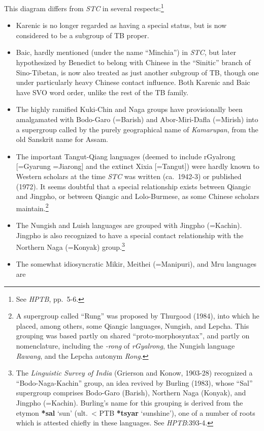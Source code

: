 \begin{itemize}
This diagram differs from \textit{STC} in several respects:\footnote{See \textit{HPTB}, pp.~5-6.}
\begin{itemize}
\item Karenic is no longer regarded as having a special status, but is now
considered to be a subgroup of TB proper.
\item Baic, hardly mentioned (under the name “Minchia”) in \textit{STC}, but later
hypothesized by Benedict to belong with Chinese in the “Sinitic” branch of 
Sino-Tibetan, is now also treated as just another subgroup of TB, though one
under particularly heavy Chinese contact influence. Both Karenic and Baic have
SVO word order, unlike the rest of the TB family.
\item The highly ramified Kuki-Chin and Naga groups have provisionally been
amalgamated with Bodo-Garo (=Barish) and Abor-Miri-Dafla (=Mirish) into a
supergroup called by the purely geographical name of \textit{Kamarupan}, from the old
Sanskrit name for Assam.
\item The important Tangut-Qiang languages (deemed to include rGyalrong
[=Gyarung =Jiarong] and the extinct Xixia [=Tangut]) were hardly known to Western
scholars at the time \textit{STC} was written (ca.~1942-3) or published (1972). It seems
doubtful that a special relationship exists between Qiangic and Jingpho, or
between Qiangic and Lolo-Burmese, as some Chinese scholars maintain.\footnote{A
supergroup called “Rung” was proposed by Thurgood (1984), into which he placed,
among others, some Qiangic languages, Nungish, and Lepcha.  This grouping was
based partly on shared “proto-morphosyntax”, and partly on nomenclature,
including the \textit{-rong} of \textit{rGyalrong},
the Nungish language \textit{Rawang}, and the Lepcha autonym \textit{Rong}.}
\item The Nungish and Luish languages are grouped with Jingpho (=Kachin).  Jingpho
is also recognized to have a special contact relationship with the Northern Naga
(=Konyak) group.\footnote{The \textit{Linguistic Survey of India}
(Grierson and Konow, 1903-28) recognized a “Bodo-Naga-Kachin” group,
an idea revived by Burling
(1983), whose “Sal” supergroup comprises Bodo-Garo (Barish), Northern Naga
(Konyak), and Jingpho (=Kachin).  Burling’s name for this grouping is derived
from the etymon \textbf{*sal} ‘sun’ (ult.\ < PTB \textbf{*tsyar} ‘sunshine’), one of a number of
roots which is attested chiefly in these languages.  See \textit{HPTB}:393-4.}
\item The somewhat idiosyncratic Mikir, Meithei (=Manipuri), and Mru languages are

\end{itemize}
\end{itemize}
